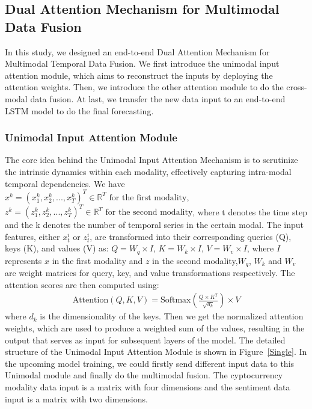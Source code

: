 \subsection{Dual Attention Mechanism for Multimodal Data Fusion}
In this study, we designed an end-to-end Dual Attention Mechanism for Multimodal Temporal Data Fusion. We first introduce the unimodal input attention module, which aims to reconstruct the inputs by deploying the attention weights. Then, we introduce the other attention module to do the cross-modal data fusion. At last, we transfer the new data input to an end-to-end LSTM model to do the final forecasting.

\subsubsection{Unimodal Input Attention Module}
The core idea behind the Unimodal Input Attention Mechanism is to scrutinize the intrinsic dynamics within each modality, effectively capturing intra-modal temporal dependencies.
We have $x^k = (x^k_1, x^k_2, ..., x^k_T)^T \in \mathbb{R}^T \text{ for the first modality}$, 
$z^k = (z^k_1, z^k_2, ..., z^k_T)^T \in \mathbb{R}^T \text{ for the second modality}$, where t denotes the time step and the k denotes the number of temporal series in the certain modal. The input features, either \( x_t^i \) or \( z_t^i \), are transformed into their corresponding queries (Q), keys (K), and values (V) as: $Q = W_q \times I$, $K = W_k \times I$,
$V = W_v \times I$, where $I$ represents $x$ in the first modality and $z$ in the second modality,$W_q$, $W_k$ and $W_v$ are weight matrices for query, key, and value transformations respectively. The attention scores are then computed using:
\begin{align*}
    \text{Attention}(Q, K, V) = \text{Softmax}\left(\frac{Q \times K^T}{\sqrt{d_k}}\right) \times V
\end{align*}
where $d_k$ is the dimensionality of the keys. Then we get the normalized attention weights, which are used to produce a weighted sum of the values, resulting in the output that serves as input for subsequent layers of the model. The detailed structure of the Unimodal Input Attention Module is shown in Figure~\ref{Single}. In the upcoming model training, we could firstly send different input data to this Unimodal module and finally do the multimodal fusion. The cyptocurrency modality data input is a matrix with four dimensions and the sentiment data input is a matrix with two dimensions. 

